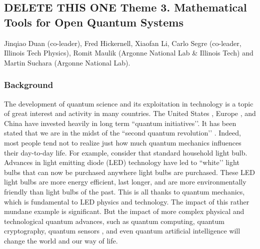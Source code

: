 \documentclass[11pt]{NSFamsart}
\begin{document}


\iffalse
\subsection*{\color{magenta}DELETE THIS ONE Theme 3. Mathematical Tools for Open Quantum Systems}
Jinqiao Duan (co-leader), Fred Hickernell, Xiaofan Li,  Carlo Segre (co-leader, Illinois Tech Physics), Romit Maulik (Argonne National Lab \& Illinois Tech) and Martin Suchara (Argonne National Lab).

\subsubsection*{Background} The development of quantum science and its exploitation in technology is a topic of great interest and activity in many countries. The United States \cite{raymer2019us}, Europe \cite{riedel2019europe}, and China \cite{kania2018quantum} have invested heavily in long term ``quantum initiatives’’.  It has been stated that we are in the midst of the ``second quantum revolution’’ \cite{kania2018quantum}. Indeed,  most people tend not to realize just how much quantum mechanics influences their day-to-day life. For example, consider that standard household light bulb. Advances in light emitting diode (LED) technology have led to ``white’’ light bulbs that can now be purchased anywhere light bulbs are purchased. These LED light bulbs are more energy efficient, last longer, and are more environmentally friendly than light bulbs of the past. This is all thanks to quantum mechanics, which is fundamental to LED physics and technology. The impact of this rather mundane example is significant. But the impact of more complex physical and technological quantum advances, such as quantum computing, quantum cryptography, quantum sensors \cite{ng2020guest}, and even quantum artificial intelligence \cite{taylor2020quantum} will change the world and our way of life.
\end{document}
